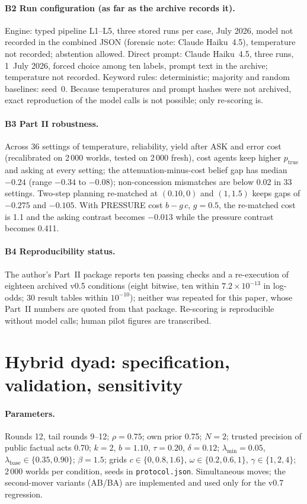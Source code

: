 \documentclass[runningheads]{llncs}
\newcommand{\Etrue}{p_{\mathrm{true}}}
\begin{document}
\paragraph{B2 Run configuration (as far as the archive records it).} Engine: typed pipeline L1--L5, three stored runs per case, July 2026, model not recorded in the combined JSON (forensic note: Claude Haiku~4.5), temperature not recorded; abstention allowed. Direct prompt: Claude Haiku~4.5, three runs, 1~July 2026, forced choice among ten labels, prompt text in the archive; temperature not recorded. Keyword rules: deterministic; majority and random baselines: seed~0. Because temperatures and prompt hashes were not archived, exact reproduction of the model calls is not possible; only re-scoring is.
\paragraph{B3 Part II robustness.} Across 36 settings of temperature, reliability, yield after ASK and error cost (recalibrated on 2\,000 worlds, tested on 2\,000 fresh), cost agents keep higher $\Etrue$ and asking at every setting; the attenuation-minus-cost belief gap has median $-0.24$ (range $-0.34$ to $-0.08$); non-concession mismatches are below 0.02 in 33 settings. Two-step planning re-matched at $(0.10,0)$ and $(1,1.5)$ keeps gaps of $-0.275$ and $-0.105$. With PRESSURE cost $b-g\,c$, $g=0.5$, the re-matched cost is 1.1 and the asking contrast becomes $-0.013$ while the pressure contrast becomes 0.411.
\paragraph{B4 Reproducibility status.} The author's Part~II package reports ten passing checks and a re-execution of eighteen archived v0.5 conditions (eight bitwise, ten within $7.2\times10^{-13}$ in log-odds; 30 result tables within $10^{-10}$); neither was repeated for this paper, whose Part~II numbers are quoted from that package. Re-scoring is reproducible without model calls; human pilot figures are transcribed.

\section{Hybrid dyad: specification, validation, sensitivity}
\label{app:C}
\paragraph{Parameters.} Rounds 12, tail rounds 9--12; $\rho=0.75$; own prior 0.75; $N=2$; trusted precision of public factual acts 0.70; $k=2$, $b=1.10$, $\tau=0.20$, $\delta=0.12$; $\lambda_{\min}=0.05$, $\lambda_{\mathrm{base}}\in\{0.35,0.90\}$; $\beta=1.5$; grids $c\in\{0,0.8,1.6\}$, $\omega\in\{0.2,0.6,1\}$, $\gamma\in\{1,2,4\}$; 2\,000 worlds per condition, seeds in \texttt{protocol.json}. Simultaneous moves; the second-mover variants (AB/BA) are implemented and used only for the v0.7 regression.
\end{document}
